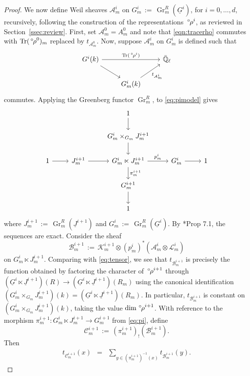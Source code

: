 \documentclass[10pt]{amsart}
\theoremstyle{plain}
\theoremstyle{definition}
\newcommand{\EE}{\mathbb{\bar Q}_\ell}
\newcommand{\Fq}{k}
\DeclareMathOperator{\Gr}{Gr}
\DeclareMathOperator{\trace}{Tr}
\newcommand{\ceq}{{\, :=\, }}
\newcommand{\trFrob}[1]{t_{#1}}
\newcommand{\cs}[1]{{\mathcal{#1}}}
\newcommand{\orho}{{\,^\circ \hskip-1pt \rho}}
\begin{document}
\begin{proof}
We now define Weil sheaves $\cs{A}^i_m$ on $G_m^i \ceq \Gr^{R}_m(\underline{G}^{i})$, for $i=0,\ldots ,d$, recursively, following the construction of the representations $\orho^i$, as reviewed in Section~\ref{ssec:review}.
First, set $\cs{A}_m^0 = A_m^0$ and note that \eqref{eqn:tracerho} commutes with $\trace(\orho^0)_m$ replaced by $\trFrob{\cs{A}_m^0}$.
Now, suppose $\cs{A}^i_m$ on $G_m^i$ is defined such that
\[
\begin{tikzcd}
G^i(\Fq) \arrow{rr}{\trace(\orho^i)} \arrow{rd} && \EE\\
& G_m^i(\Fq) \arrow{ru}[swap]{\trFrob{\cs{A}_m^i}} & 
\end{tikzcd}
\]
commutes.
Applying the Greenberg functor $\Gr^{R}_m$, to \eqref{eq:pimodel} gives
\begin{equation}\label{eq:pi}
\begin{tikzcd}
\ && 1 \arrow{d} && \\
\ && G_m^{i}\times_{G_m} J_m^{i+1} \arrow{d} && \\
1 \arrow{r} &J_m^{i+1} \arrow{r} & G_m^i \ltimes J_m^{i+1} \arrow{d}{\pi_m^{i+1}} \arrow{r}{p_m^{i}} & G_m^i \arrow{r} & 1\\
&& G_m^{i+1} \arrow{d} && \\
&& 1 && 
\end{tikzcd}
\end{equation}
where $J_m^{i+1} \ceq \Gr^{R}_m(\underline{J}^{i+1})$ and $G_m^{i} \ceq \Gr^{R}_m(\underline{G}^{i})$.
By \cite{bertapelle-gonzales:Greenberg}*{Prop 7.1}, the sequences are exact.
Consider the sheaf 
\[
\cs{B}_m^{i+1} \ceq \cs{K}_m^{i+1} \otimes (p_m^{i})^*(\cs{A}_m^{i}\otimes \cs{L}_m^{i})
\]
on $G_m^{i}\ltimes J_m^{i+1}$.
Comparing with \eqref{eq:tensor}, we see that $\trFrob{\cs{B}_m^{i+1}}$ is precisely the function obtained by factoring the character of $\orho^{i+1}$ through $(\underline{G}^{i}\ltimes \underline{J}^{i+1})(R) \to (\underline{G}^{i}\ltimes \underline{J}^{i+1})(R_m)$ using the canonical identification $(G_m^{i}\times_{G_m} J_m^{i+1})(\Fq) =  (\underline{G}^{i}\ltimes \underline{J}^{i+1})(R_m)$. 
In particular, $\trFrob{\cs{B}^{i+1}_m}$ is constant on $(G_m^{i}\times_{G_m} J_m^{i+1})(\Fq)$, taking the value $\dim \orho^{i+1}$.
With reference to the morphism $\pi_m^{i+1} : G_m^i \ltimes J_m^{i+1} \to G_m^{i+1}$ from \eqref{eq:pi}, define 
\[
\cs{C}_m^{i+1} \ceq (\pi_m^{i+1})_! (\cs{B}_m^{i+1}).
\]
Then
\begin{eqnarray*}
\trFrob{\cs{C}^{i+1}_m}(x)
&=& \sum_{y\in (\pi_m^{i+1})^{-1}(x)}  \trFrob{\cs{B}_m^{i+1}}(y).
\end{eqnarray*}

\end{proof}
\end{document}
